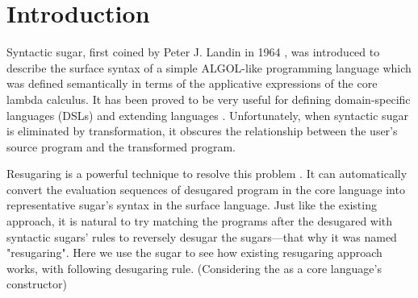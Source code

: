 \section{Introduction}









Syntactic sugar, first coined by Peter J. Landin in 1964 \cite{syntacticsugar}, was introduced to describe the surface syntax of a simple ALGOL-like programming language which was defined semantically in terms of the applicative expressions of the core lambda calculus. It has been proved to be very useful for defining domain-specific languages (DSLs) and extending languages \cite{FellFFKBMT18,CulpFFK19}.
Unfortunately, when syntactic sugar is eliminated by transformation, it obscures the relationship between the user’s source program and the transformed program.



Resugaring is a powerful technique to resolve this problem \cite{resugaring,hygienic}. It  can automatically convert the evaluation sequences of desugared program in the core language into representative sugar's syntax in the surface language. Just like the existing approach, it is natural to try matching the programs after the desugared with syntactic sugars' rules to reversely desugar the sugars---that why it was named "resugaring". Here we use the sugar  to see how existing resugaring approach works, with following desugaring rule. (Considering the  as a core language's constructor)

